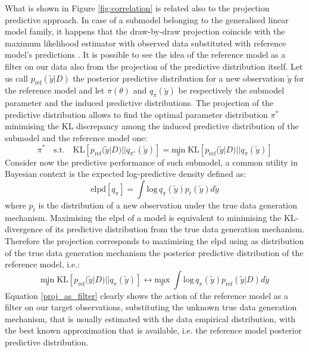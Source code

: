 \documentclass[american,]{article}
\theoremstyle{definition}
\begin{document}
What is shown in Figure \ref{fig:correlation} is related also to the projection predictive approach. In case of a submodel belonging to the generalised linear model family, it happens that the draw-by-draw projection coincide with the maximum likelihood estimator with observed data substituted with reference model's predictions \citep{paper:original_proj}. It is possible to see the idea of the reference model as a filter on our data also from the projection of the predictive distribution itself. Let us call $p_{\text{ref}}(\tilde{y}|D)$ the posterior predictive distribution for a new observation $\tilde{y}$ for the reference model and let $\pi(\theta)$ and $q_{\pi}(\tilde{y})$ be respectively the submodel parameter and the induced predictive distributions. The projection of the predictive distribution allows to find the optimal parameter distribution $\pi^{*}$ minimising the KL discrepancy among the induced predictive distribution of the submodel and the reference model one:
\
\begin{equation} 
\pi^{*}\quad \text{s.t.} \quad \text{KL}[p_{\text{ref}}(\tilde{y}|D)||q_{\pi^{*}}(\tilde{y})]=\underset{\pi}{\text{min}} \; \text{KL}[p_{\text{ref}}(\tilde{y}|D)||q_{\pi}(\tilde{y})] 
\end{equation}
Consider now the predictive performance of such submodel, a common utility in Bayesian context is the expected log-predictive density defined as:
\
\begin{equation} 
\text{elpd}[q_{\pi}]=\int \text{log}\,q_{\pi}(\tilde{y})p_{t}(\tilde{y})d\tilde{y} 
\end{equation}
where $p_{t}$ is the distribution of a new observation under the true data generation mechanism. Maximising the elpd of a model is equivalent to minimising the KL-divergence of its predictive distribution from the true data generation mechanism. Therefore the projection corresponds to maximising the elpd using as distribution of the true data generation mechanism the posterior predictive distribution of the reference model, i.e.:
\
\begin{equation} \label{proj_as_filter}
\underset{\pi}{\text{min}} \; \text{KL}[p_{\text{ref}}(\tilde{y}|D)||q_{\pi}(\tilde{y})] \leftrightarrow \underset{\pi}{\text{max}} \; \int \text{log}\,q_{\pi}(\tilde{y})p_{\text{ref}}(\tilde{y}|D)d\tilde{y} 
\end{equation}
Equation \eqref{proj_as_filter} clearly shows the action of the reference model as a filter on our target observations, substituting the unknown true data generation mechanism, that is usually estimated with the data empirical distribution, with the best known approximation that is available, i.e. the reference model posterior predictive distribution.
\end{document}

